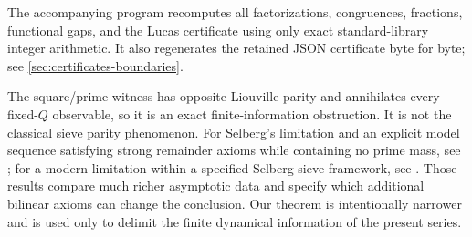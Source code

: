 The accompanying program recomputes all factorizations, congruences,
fractions, functional gaps, and the Lucas certificate using only exact
standard-library integer arithmetic.  It also regenerates the retained JSON
certificate byte for byte; see \cref{sec:certificates-boundaries}.

\begin{remark}\label{rem:finite-vs-classical-parity}
The square/prime witness has opposite Liouville parity and annihilates every
fixed-$Q$ observable, so it is an exact finite-information obstruction.  It
is not the classical sieve parity phenomenon.  For Selberg's limitation and
an explicit model sequence satisfying strong remainder axioms while
containing no prime mass, see \citet{Selberg1949,FriedlanderIwaniec1998}; for
a modern limitation within a specified Selberg-sieve framework, see
\citet{Polymath2014}.  Those results compare much richer asymptotic data and
specify which additional bilinear axioms can change the conclusion.  Our
theorem is intentionally narrower and is used only to delimit the finite
dynamical information of the present series.
\end{remark}

